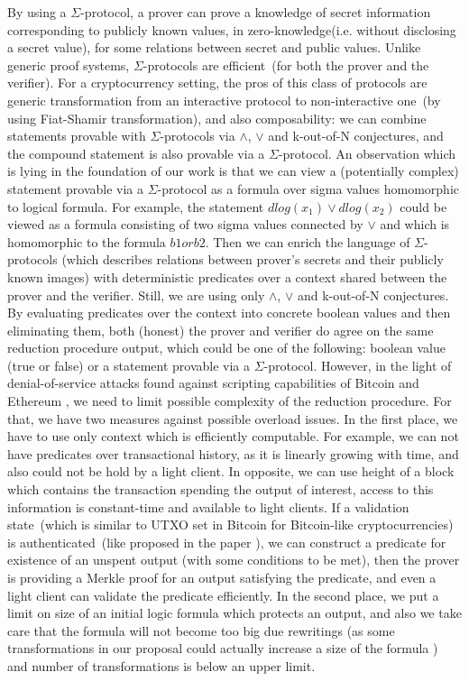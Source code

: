 \documentclass[11pt]{article}
\newcommand{\authnote}[2]{\marginpar{\parbox{\marginparwidth}{\tiny %
  \textsf{#1 {\textcolor{blue}{notes: #2}}}}}%
  \textcolor{blue}{\textbf{\dag}}}
\newcommand{\authnote}[2]{
  \textsf{#1 \textcolor{blue}{: #2}}}
\newcommand{\authnote}[2]{}
\newcommand{\knote}[1]{{\authnote{\textcolor{green}{kushti notes}}{#1}}}
\newcommand{\mnote}[1]{{\authnote{\textcolor{red}{Morphic}}{#1}}}
\begin{document}
By using a $\Sigma$-protocol, a prover can prove a knowledge of secret information corresponding to publicly known values, in zero-knowledge(i.e. without disclosing a secret value), for some relations between secret and public values. Unlike generic proof systems, $\Sigma$-protocols are efficient~(for both the prover and the verifier). For a cryptocurrency setting, the pros of this class of protocols are generic transformation from an interactive protocol to non-interactive one~(by using Fiat-Shamir transformation), and also composability: we can combine statements provable with $\Sigma$-protocols via $\land$, $\lor$ and k-out-of-N conjectures, and the compound statement is also provable via a $\Sigma$-protocol. An observation which is lying in the foundation of our work is that we can view a (potentially complex) statement provable via a $\Sigma$-protocol as a formula over sigma values homomorphic to logical formula. For example, the statement $dlog(x_1) \lor dlog(x_2)$ could be viewed as a formula consisting of two sigma values connected by $\lor$ and which is homomorphic to the formula $b1 or b2$. Then we can enrich the language of $\Sigma$-protocols (which describes relations between prover's secrets and their publicly known images) with deterministic predicates over a context shared between the prover and the verifier. Still, we are using only $\land$, $\lor$ and k-out-of-N conjectures. By evaluating predicates over the context into concrete boolean values and then eliminating them, both (honest) the prover and verifier do agree on the same reduction procedure output, which could be one of the following: boolean value (true or false) or a statement provable via a $\Sigma$-protocol. However, in the light of denial-of-service attacks found against scripting capabilities of Bitcoin and Ethereum \knote{todo: links}, we need to limit possible complexity of the reduction procedure. For that, we have two measures against possible overload issues. In the first place, we have to use only context which is efficiently computable. For example, we can not have predicates over transactional history, as it is linearly growing with time, and also could not be hold by a light client. In opposite, we can use height of a block which contains the transaction spending the output of interest, access to this information is constant-time and available to light clients. If a validation state~(which is similar to UTXO set in Bitcoin for Bitcoin-like cryptocurrencies) is authenticated~(like proposed in the paper \knote{cite AVL paper}), we can construct a predicate for existence of an unspent output (with some conditions to be met), then the prover is providing a Merkle proof for an output satisfying the predicate, and even a light client can validate the predicate efficiently. In the second place, we put a limit on size of an initial logic formula which protects an output, and also we take care that the formula will not become too big due rewritings (as some transformations in our proposal could actually increase a size of the formula\mnote{For example? Looks like all the transforms are decreasing.}) and number of transformations is below an upper limit.
\end{document}
